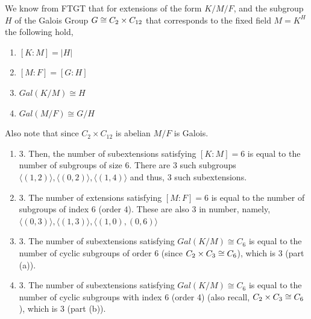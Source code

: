 \documentclass[12pt]{article}
\begin{document}
\begin{solution}
    \bbni 

    We know from FTGT that for extensions of the form $K/M/F$, and the subgroup $H$ of the Galois Group $G \cong C_2 \times C_{12}$ that corresponds to the fixed field $M = K^H$ the following hold, 
        \begin{enumerate}
            \item $[K:M] = |H|$
            \item $[M:F] = [G:H]$
            \item $Gal(K/M) \cong H$
            \item $Gal(M/F) \cong G/H$
        \end{enumerate}
    Also note that since $C_2 \times C_{12}$ is abelian $M/F$ is Galois.

    \begin{enumerate}
        \item [(a)] $3$. 
        Then, the number of subextensions satisfying $[K:M] = 6$ is equal to the number of subgroups of size $6$. There are $3$ such subgroups $\langle (1, 2) \rangle, \langle  (0, 2) \rangle,  \langle (1,4) \rangle$ and thus, $3$ such subextensions. 
        
        \item[(b)] $3$. 
        The number of extensions satisfying $[M:F] = 6$ is equal to the number of subgroups of index $6$ (order $4$). These are also $3$ in number, namely, $\langle (0, 3) \rangle, \langle (1, 3) \rangle, \langle (1, 0), (0, 6) \rangle$
        
        \item[(c)] $3$. The number of subextensions satisfying $Gal(K/M) \cong C_6$ is equal to the number of cyclic subgroups of order $6$ (since $C_2 \times C_3 \cong C_6$), which is $3$ (part (a)). 
        
        \item[(d)] $3$. The number of subextensions satisfying $Gal(K/M) \cong C_6$ is equal to the number of cyclic subgroups with index $6$ (order 4) (also recall, $C_2 \times C_3 \cong C_6$), which is $3$ (part (b)). 
    \end{enumerate}
\end{solution}
\end{document}
